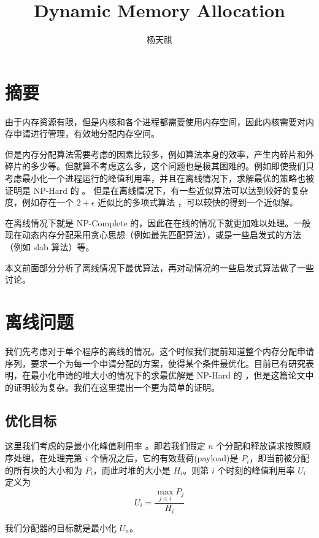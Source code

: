 \documentclass{noiassignment}
\title{Dynamic Memory Allocation}
\author{杨天祺}
\begin{document}
	\maketitle

	\tableofcontents

	\newpage

	\section{摘要}
	由于内存资源有限，但是内核和各个进程都需要使用内存空间，因此内核需要对内存申请进行管理，有效地分配内存空间。

	但是内存分配算法需要考虑的因素比较多，例如算法本身的效率，产生内碎片和外碎片的多少等。但就算不考虑这么多，这个问题也是极其困难的。例如即使我们只考虑最小化一个进程运行的峰值利用率，并且在离线情况下，求解最优的策略也被证明是 NP-Hard 的 \cite{opt-nph}。
	但是在离线情况下，有一些近似算法可以达到较好的复杂度，例如存在一个 $2 + \epsilon$ 近似比的多项式算法 \cite{M2015A}，可以较快的得到一个近似解。

	在离线情况下就是 NP-Complete 的，因此在在线的情况下就更加难以处理。一般现在动态内存分配采用贪心思想（例如最先匹配算法），或是一些启发式的方法（例如 slab 算法\cite{bonwick1994slab}）等。

	本文前面部分分析了离线情况下最优算法，再对动情况的一些启发式算法做了一些讨论。

	\section{离线问题}
	我们先考虑对于单个程序的离线的情况。这个时候我们提前知道整个内存分配申请序列，要求一个为每一个申请分配的方案，使得某个条件最优化。目前已有研究表明，在最小化申请的堆大小的情况下的求最优解是 NP-Hard 的 \cite{opt-nph}，但是这篇论文中的证明较为复杂。我们在这里提出一个更为简单的证明。

	\subsection{优化目标}

	这里我们考虑的是最小化峰值利用率 \cite{Bryant:2015:CSP:2846227}。即若我们假定 $n$ 个分配和释放请求按照顺序处理，在处理完第 $i$ 个情况之后，它的有效载荷(payload)是 $P_i$，即当前被分配的所有块的大小和为 $P_i$，而此时堆的大小是 $H_i$。则第 $i$ 个时刻的峰值利用率 $U_i$ 定义为
	$$
	U_i = \frac{\max_{j \le i} P_j}{H_i}
	$$

	我们分配器的目标就是最小化 $U_n$。
	
\end{document}
